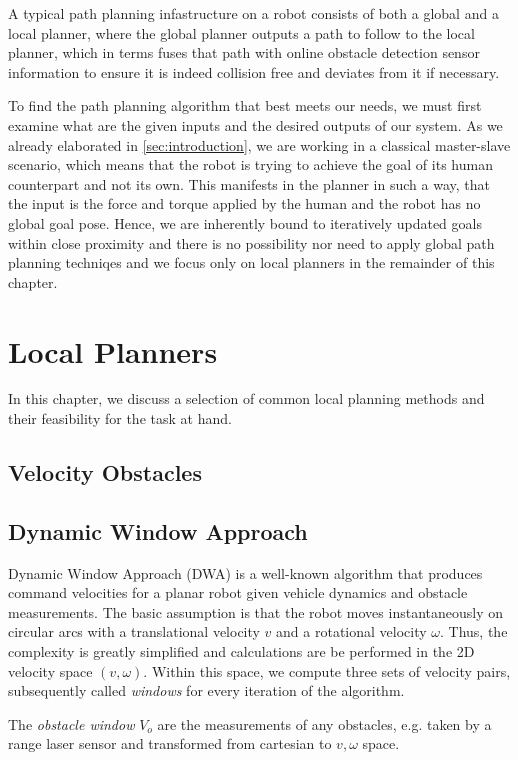 A typical path planning infastructure on a robot consists of both a global and a local planner, where the global planner outputs a path to follow to the local planner, which in terms fuses that path with online obstacle detection sensor information to ensure it is indeed collision free and deviates from it if necessary.

To find the path planning algorithm that best meets our needs, we must first examine what are the given inputs and the desired outputs of our system. As we already elaborated in \cref{sec:introduction}, we are working in a classical master-slave scenario, which means that the robot is trying to achieve the goal of its human counterpart and not its own. This manifests in the planner in such a way, that the input is the force and torque applied by the human and the robot has no global goal pose. Hence, we are inherently bound to iteratively updated goals within close proximity and there is no possibility nor need to apply global path planning techniqes and we focus only on local planners in the remainder of this chapter.

\section{Local Planners}
In this chapter, we discuss a selection of common local planning methods and their feasibility for the task at hand.
\subsection{Velocity Obstacles}
\subsection{Dynamic Window Approach}
Dynamic Window Approach (DWA) \citep{fox1997dynamic} is a well-known algorithm that produces command velocities for a planar robot given vehicle dynamics and obstacle measurements. The basic assumption is that the robot moves instantaneously on circular arcs with a translational velocity $v$ and a rotational velocity $\omega$. Thus, the complexity is greatly simplified and calculations are be performed in the 2D velocity space $(v,\omega)$. Within this space, we compute three sets of velocity pairs,  subsequently called \emph{windows} for every iteration of the algorithm.

The \emph{obstacle window} $V_o$ are the measurements of any obstacles, e.g. taken by a range laser sensor and transformed from cartesian to $v,\omega$ space.

